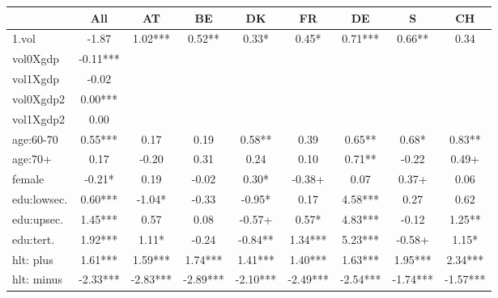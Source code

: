 {
\def\sym#1{\ifmmode^{#1}\else\(^{#1}\)\fi}
\begin{tabular}{l*{8}{c}}
\hline\hline
            &\multicolumn{1}{c}{All}&\multicolumn{1}{c}{AT}&\multicolumn{1}{c}{BE}&\multicolumn{1}{c}{DK}&\multicolumn{1}{c}{FR}&\multicolumn{1}{c}{DE}&\multicolumn{1}{c}{S}&\multicolumn{1}{c}{CH}\\
\hline
1.vol       &       -1.87   &        1.02***&        0.52** &        0.33*  &        0.45*  &        0.71***&        0.66** &        0.34   \\
vol0Xgdp    &       -0.11***&               &               &               &               &               &               &               \\
vol1Xgdp    &       -0.02   &               &               &               &               &               &               &               \\
vol0Xgdp2   &        0.00***&               &               &               &               &               &               &               \\
vol1Xgdp2   &        0.00   &               &               &               &               &               &               &               \\
age:60-70   &        0.55***&        0.17   &        0.19   &        0.58** &        0.39   &        0.65** &        0.68*  &        0.83** \\
age:70+     &        0.17   &       -0.20   &        0.31   &        0.24   &        0.10   &        0.71** &       -0.22   &        0.49+  \\
female      &       -0.21*  &        0.19   &       -0.02   &        0.30*  &       -0.38+  &        0.07   &        0.37+  &        0.06   \\
edu:lowsec. &        0.60***&       -1.04*  &       -0.33   &       -0.95*  &        0.17   &        4.58***&        0.27   &        0.62   \\
edu:upsec.  &        1.45***&        0.57   &        0.08   &       -0.57+  &        0.57*  &        4.83***&       -0.12   &        1.25** \\
edu:tert.   &        1.92***&        1.11*  &       -0.24   &       -0.84** &        1.34***&        5.23***&       -0.58+  &        1.15*  \\
hlt: plus   &        1.61***&        1.59***&        1.74***&        1.41***&        1.40***&        1.63***&        1.95***&        2.34***\\
hlt: minus  &       -2.33***&       -2.83***&       -2.89***&       -2.10***&       -2.49***&       -2.54***&       -1.74***&       -1.57***\\

\end{tabular}}
